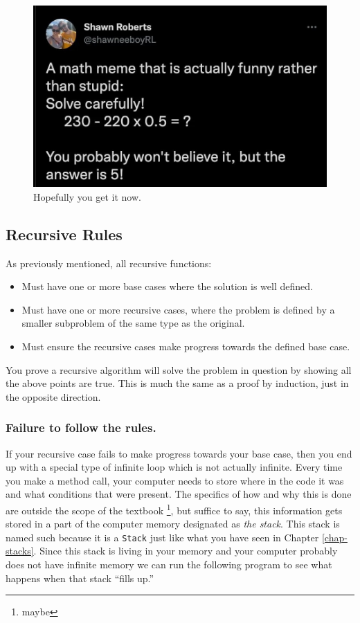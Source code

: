 \begin{figure}[h!]
	\centering
	\includegraphics[width=0.7\linewidth]{pics/factorial}
	\caption{Hopefully you get it now.}
	\label{fig:factorial_meme}
\end{figure}



\subsection{Recursive Rules}

As previously mentioned, all recursive functions:
\begin{itemize}
	\item Must have one or more base cases where the solution is well defined.
	\item Must have one or more recursive cases, where the problem is defined by a smaller subproblem of the same type as the original.
	\item Must ensure the recursive cases make progress towards the defined base case.
\end{itemize}


You prove a recursive algorithm will solve the problem in question by showing all the above points are true.  
This is much the same as a proof by induction, just in the opposite direction.

\subsubsection{Failure to follow the rules.}

If your recursive case fails to make progress towards your base case, then you end up with a special type of infinite loop which is not actually infinite.  Every time you make a method call,  your computer needs to store where in the code it was and what conditions that were present.  The specifics of how and why this is done are outside the scope of the textbook \footnote{maybe}, but suffice to say, this information gets stored in a part of the computer memory designated as \textit{the stack}.  This stack is named such because it is a \texttt{Stack} just like what you have seen in Chapter \ref{chap-stacks}.  Since this stack is living in your memory and your computer probably does not have infinite memory  we can run the following program to see what happens when that stack ``fills up.''


